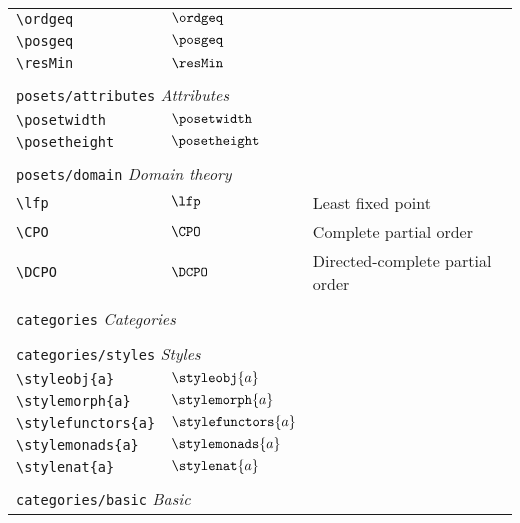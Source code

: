 \begin{longtable}{lll}
 {\color[rgb]{0.5,0.5,0.5}\texttt{\textbackslash ordgeq}} & $\ordgeq$ & \\ 
 {\color[rgb]{0.5,0.5,0.5}\texttt{\textbackslash posgeq}} & $\posgeq$ & \\ 
 {\color[rgb]{0.5,0.5,0.5}\texttt{\textbackslash resMin}} & $\resMin$ & \\ 
  &  & \\ 
 \multicolumn{3}{l}{{\color[rgb]{0.5,0.5,0.5}\texttt{posets/attributes}} \emph{Attributes}}\\ 
 \hline
{\color[rgb]{0.5,0.5,0.5}\texttt{\textbackslash posetwidth}} & $\posetwidth$ & \\ 
 {\color[rgb]{0.5,0.5,0.5}\texttt{\textbackslash posetheight}} & $\posetheight$ & \\ 
  &  & \\ 
 \multicolumn{3}{l}{{\color[rgb]{0.5,0.5,0.5}\texttt{posets/domain}} \emph{Domain theory}}\\ 
 \hline
{\color[rgb]{0.5,0.5,0.5}\texttt{\textbackslash lfp}} & $\lfp$ &  Least fixed point\\ 
 {\color[rgb]{0.5,0.5,0.5}\texttt{\textbackslash CPO}} & $\CPO$ &  Complete partial order\\ 
 {\color[rgb]{0.5,0.5,0.5}\texttt{\textbackslash DCPO}} & $\DCPO$ &  Directed-complete partial order\\ 
  &  & \\ 
 \multicolumn{3}{l}{{\color[rgb]{0.5,0.5,0.5}\texttt{categories}} \emph{Categories}}\\ 
 \hline
\hline
 &  & \\ 
 \multicolumn{3}{l}{{\color[rgb]{0.5,0.5,0.5}\texttt{categories/styles}} \emph{Styles}}\\ 
 \hline
{\color[rgb]{0.5,0.5,0.5}\texttt{\textbackslash styleobj\{a\}}} & $\styleobj{a}$ & \\ 
 {\color[rgb]{0.5,0.5,0.5}\texttt{\textbackslash stylemorph\{a\}}} & $\stylemorph{a}$ & \\ 
 {\color[rgb]{0.5,0.5,0.5}\texttt{\textbackslash stylefunctors\{a\}}} & $\stylefunctors{a}$ & \\ 
 {\color[rgb]{0.5,0.5,0.5}\texttt{\textbackslash stylemonads\{a\}}} & $\stylemonads{a}$ & \\ 
 {\color[rgb]{0.5,0.5,0.5}\texttt{\textbackslash stylenat\{a\}}} & $\stylenat{a}$ & \\ 
  &  & \\ 
 \multicolumn{3}{l}{{\color[rgb]{0.5,0.5,0.5}\texttt{categories/basic}} \emph{Basic}}\\ 

\end{longtable}

